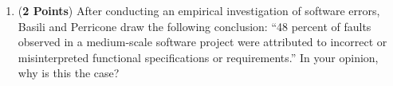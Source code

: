 \documentclass[12pt,epsf,psfig,graphicx]{article}
\begin{document}
\begin{enumerate}
\begin{enumerate}
\item ({\bf 2 Points}) After conducting an empirical investigation of
  software errors, Basili and Perricone draw the following conclusion:
  ``48 percent of faults observed in a medium-scale software project
  were attributed to incorrect or misinterpreted functional
  specifications or requirements.''  In your opinion, why is this the
  case?

% 
% 
% 
% 
% 
% 
% 
% 
% 
% 
\end{enumerate}

\end{enumerate}
\end{document}
